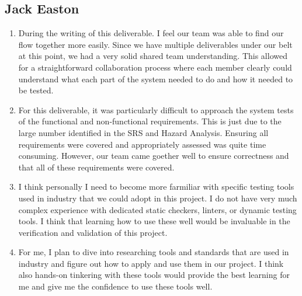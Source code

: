 \documentclass[12pt, titlepage]{article}
\begin{document}
\subsection*{Jack Easton}
\begin{enumerate}
  \item During the writing of this deliverable. I feel our team was able to find our flow together more easily. Since we have multiple deliverables under our belt at this point, we had a very solid shared team understanding. This allowed for a straightforward collaboration process where each member clearly could understand what each part of the system needed to do and how it needed to be tested.
  \item For this deliverable, it was particularly difficult to approach the system tests of the functional and non-functional requirements. This is just due to the large number identified in the SRS and Hazard Analysis. Ensuring all requirements were covered and appropriately assessed was quite time consuming. However, our team came goether well to ensure correctness and that all of these requirements were covered.
  \item I think personally I need to become more farmiliar with specific testing tools used in industry that we could adopt in this project. I do not have very much complex experience with dedicated static checkers, linters, or dynamic testing tools. I think that learning how to use these well would be invaluable in the verification and validation of this project.
  \item For me, I plan to dive into researching tools and standards that are used in industry and figure out how to apply and use them in our project. I think also hands-on tinkering with these tools would provide the best learning for me and give me the confidence to use these tools well.
\end{enumerate}
\end{document}
